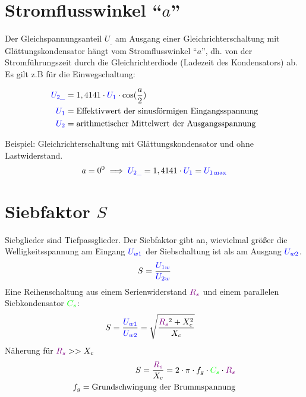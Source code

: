 \documentclass[11pt,a4paper,titlepage,parskip=half]{scrreprt}
\begin{document}
           \section{Stromflusswinkel "`$a$"'}
           Der  Gleichspannungsanteil  $U_{\_}$  am  Ausgang  einer  Gleichrichterschaltung  mit  Glättungskondensator hängt vom Stromflusswinkel "`$a$"', dh. von der Stromführungszeit durch die Gleichrichterdiode (Ladezeit des Kondensators) ab. Es gilt z.B für die Einwegschaltung:
           
           \begin{align*}
           \textcolor{blue}{U_{2\_}} &= 1,4141 \cdot \textcolor{blue}{U_1} \cdot \cos(\frac{a}{2})\\
           \textcolor{blue}{U_1}&= \text{Effektivwert der sinusförmigen Eingangsspannung}\\
           \textcolor{blue}{U_2}&= \text{arithmetischer Mittelwert der Ausgangsspannung}\\
           \end{align*}
           
           Beispiel: Gleichrichterschaltung mit Glättungskondensator und ohne Lastwiderstand.
           \begin{equation*}
           a = 0^0 \implies \textcolor{blue}{U_{2\_}} = 1,4141 \cdot \textcolor{blue}{U_1} = \textcolor{blue}{U_{1\max}}
           \end{equation*}
           \section{Siebfaktor $S$}
           Siebglieder sind Tiefpassglieder. Der Siebfaktor gibt an, wievielmal größer die Welligkeitsspannung am Eingang $\textcolor{blue}{U_{w1}}$ der Siebschaltung ist als am Ausgang $\textcolor{blue}{U_{w2}}$.
           \begin{equation*}
           S = \frac{\textcolor{blue}{U_{1w}}}{\textcolor{blue}{U_{2w}}}
           \end{equation*}
           Eine Reihenschaltung aus einem Serienwiderstand $\textcolor{violet}{R_s}$ und einem parallelen Siebkondensator $\textcolor{green}{C_s}$:
           \begin{align*}
            S &= \frac{\textcolor{blue}{U_{w1}}}{\textcolor{blue}{U_{w2}}} = \sqrt{\frac{\textcolor{violet}{R_s}^2 + X_c^2}{X_c}}
           \end{align*}
           Näherung für $\textcolor{violet}{R_s} >> X_c$
           \begin{align*}
           S = \frac{\textcolor{violet}{R_s}}{X_c} = 2 \cdot \pi \cdot f_g \cdot \textcolor{green}{C_s} \cdot \textcolor{violet}{R_s}\\
           f_g = \text{Grundschwingung der Brummspannung}
           \end{align*}
           
\end{document}
